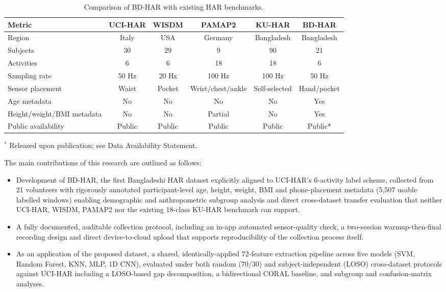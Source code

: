 \documentclass[conference]{IEEEtran}
\begin{document}
\begin{table}[t]
\centering
\footnotesize
\setlength{\tabcolsep}{5pt}
\begin{threeparttable}
\caption{Comparison of BD-HAR with existing HAR benchmarks.}
\label{tab:dataset_compare}
\begin{tabular}{lccccc}
\hline
Metric & UCI-HAR & WISDM & PAMAP2 & KU-HAR & BD-HAR \\
\hline
Region & Italy & USA & Germany & Bangladesh & Bangladesh \\
Subjects & 30 & 29 & 9 & 90 & 21 \\
Activities & 6 & 6 & 18 & 18 & 6 \\
Sampling rate & 50 Hz & 20 Hz & 100 Hz & 100 Hz & 50 Hz \\
Sensor placement & Waist & Pocket & Wrist/chest/ankle & Self-selected & Hand/pocket \\
Age metadata & No & No & No & No & Yes \\
Height/weight/BMI metadata & No & No & Partial & No & Yes \\
Public availability & Public & Public & Public & Public & Public* \\
\hline
\end{tabular}
\begin{tablenotes}
\footnotesize
\item[$^{*}$] Released upon publication; see Data Availability Statement.
\end{tablenotes}
\end{threeparttable}
\end{table}

The main contributions of this research are outlined as follows:
\begin{itemize}
\item Development of BD-HAR, the first Bangladeshi HAR dataset
explicitly aligned to UCI-HAR's 6-activity label scheme, collected
from 21 volunteers with rigorously annotated participant-level age,
height, weight, BMI and phone-placement metadata (5{,}507 usable labelled
windows) enabling demographic and anthropometric subgroup analysis
and direct cross-dataset transfer evaluation that neither UCI-HAR,
WISDM, PAMAP2 nor the existing 18-class KU-HAR benchmark can support.


\item A fully documented, auditable collection protocol, including
an in-app automated sensor-quality check, a two-session
warmup-then-final recording design and direct device-to-cloud upload that supports reproducibility of the collection process itself.

\item As an application of the proposed dataset, a shared,
identically-applied 72-feature extraction pipeline across five models
(SVM, Random Forest, KNN, MLP, 1D CNN), evaluated under both random
(70/30) and subject-independent (LOSO) cross-dataset protocols against
UCI-HAR including a LOSO-based gap decomposition, a bidirectional CORAL baseline, and subgroup and confusion-matrix analyses.
\end{itemize}
\end{document}
